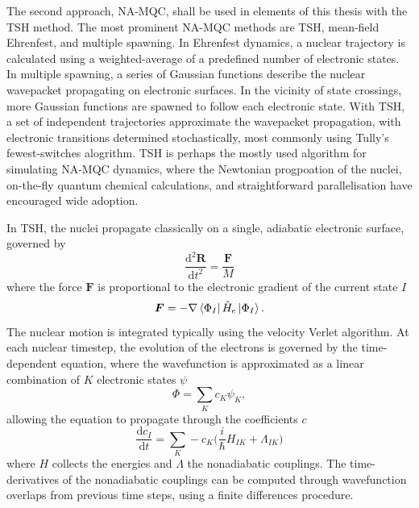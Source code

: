 The second approach, \ac{NA-MQC}, shall be used in elements of this thesis with the \ac{TSH} method. The most prominent \ac{NA-MQC} methods are \ac{TSH}, mean-field Ehrenfest, and multiple spawning.\cite{Crespo-Otero2018} In Ehrenfest dynamics, a nuclear trajectory is calculated using a weighted-average of a predefined number of electronic states. In multiple spawning, a series of Gaussian functions describe the nuclear wavepacket propagating on electronic surfaces. In the vicinity of state crossings, more Gaussian functions are spawned to follow each electronic state. With \ac{TSH}, a set of independent trajectories approximate the wavepacket propagation, with electronic transitions determined stochastically, most commonly using Tully's fewest-switches alogrithm.\cite{Tully1990} \ac{TSH} is perhaps the mostly used algorithm for simulating \ac{NA-MQC} dynamics, where the Newtonian progpoation of the nuclei, on-the-fly quantum chemical calculations, and straightforward parallelisation have encouraged wide adoption.\cite{Barbatti2011}

In \ac{TSH}, the nuclei propagate classically on a single, adiabatic electronic surface, governed by 
\begin{equation}\label{equation: nuclei_prop}
    \frac{\mathrm{d}^{2}\bm{R}}{\mathrm{d}t^{2}}=\frac{\bm{F}}{M}
\end{equation}
where the force $\bm{F}$ is proportional to the electronic gradient of the current state $I$
\begin{equation}
    \bm{F}=-\nabla{}\bra{\Phi_{I}}\hat{H}_{e}\ket{\Phi_{I}}.
\end{equation}
The nuclear motion is integrated typically using the velocity Verlet algorithm.\cite{Swope1982} At each nuclear timestep, the evolution of the electrons is governed by the time-dependent \schro{} equation, where the wavefunction is approximated as a linear combination of $K$ electronic states $\psi$
\begin{equation}
    \Phi{}=\sum_{K}c_{K}\psi_{K},
\end{equation}
allowing the \schro{} equation to propagate through the coefficients $c$
\begin{equation}\label{equation: sc-schro}
    \frac{\mathrm{d}c_{I}}{\mathrm{d}t}=\sum_{K}-c_{K}\big(\frac{i}{\hbar}H_{IK}+\Lambda_{IK}\big)
\end{equation}
where $H$ collects the energies and $\Lambda$ the nonadiabatic couplings. The time-derivatives of the nonadiabatic couplings can be computed through wavefunction overlaps from previous time steps, using a finite differences procedure.\cite{Pittner2009,Ryabinkin2015}

